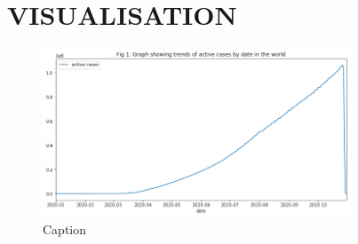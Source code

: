\documentclass[12pt,letterpaper, twoside]{article}
\begin{document}
\section{VISUALISATION}

\begin{figure}[h]
\includegraphics[width=0.9\linewidth, height=5cm]{linegraph.png}
\caption{Caption}
\label{fig:figure2}
\end{figure}
\end{document}
